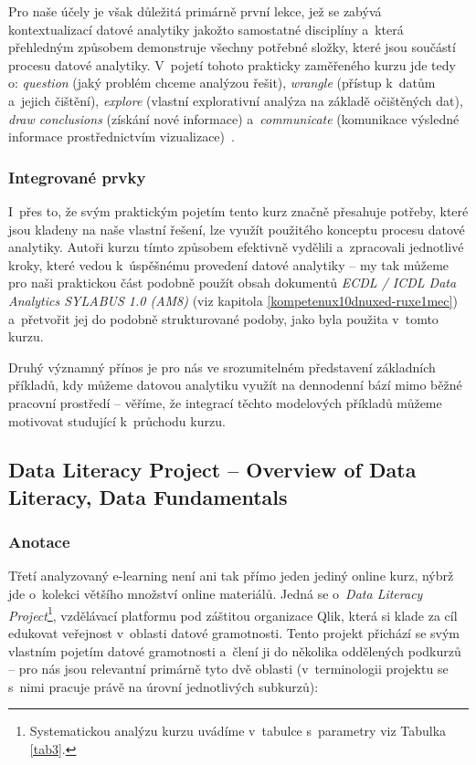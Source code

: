 Pro naše účely je však důležitá primárně první lekce, jež se zabývá kontextualizací datové analytiky jakožto samostatné disciplíny a~která přehledným způsobem demonstruje všechny potřebné složky, které jsou součástí procesu datové analytiky. V~pojetí tohoto prakticky zaměřeného kurzu jde tedy o: \emph{question} (jaký problém chceme analýzou řešit), \emph{wrangle} (přístup k~datům a~jejich čištění), \emph{explore} (vlastní explorativní analýza na základě očištěných dat), \emph{draw conclusions} (získání nové informace) a~\emph{communicate} (komunikace výsledné informace prostřednictvím vizualizace)~\parencite{course2}.

\hypertarget{integrovanuxe9-prvky-1}{%
\subsubsection{Integrované prvky}\label{integrovanuxe9-prvky-1}}

I~přes to, že svým praktickým pojetím tento kurz značně přesahuje potřeby, které jsou kladeny na naše vlastní řešení, lze využít použitého konceptu procesu datové analytiky. Autoři kurzu tímto způsobem efektivně vydělili a~zpracovali jednotlivé kroky, které vedou k~úspěšnému provedení datové analytiky -- my tak můžeme pro naši praktickou část podobně použít obsah dokumentů \emph{ECDL / ICDL Data Analytics SYLABUS 1.0 (AM8)} (viz kapitola \ref{kompetenux10dnuxed-ruxe1mec}) a~přetvořit jej do podobně strukturované podoby, jako byla použita v~tomto kurzu.

Druhý významný přínos je pro nás ve srozumitelném představení základních příkladů, kdy můžeme datovou analytiku využít na dennodenní bází mimo běžné pracovní prostředí -- věříme, že integrací těchto modelových příkladů můžeme motivovat studující k~průchodu kurzu.

\hypertarget{data-literacy-project-overview-of-data-literacy-data-fundamentals}{%
\subsection{Data Literacy Project -- Overview of Data Literacy, Data Fundamentals}\label{data-literacy-project-overview-of-data-literacy-data-fundamentals}}

\hypertarget{anotace-2}{%
\subsubsection{Anotace}\label{anotace-2}}

Třetí analyzovaný e-learning není ani tak přímo jeden jediný online kurz, nýbrž jde o~kolekci většího množství online materiálů. Jedná se o~\emph{Data Literacy Project}\footnote{Systematickou analýzu kurzu uvádíme v~tabulce s~parametry viz Tabulka \ref{tab3}.}, vzdělávací platformu pod záštitou organizace Qlik, která si klade za cíl edukovat veřejnost v~oblasti datové gramotnosti. Tento projekt přichází se svým vlastním pojetím datové gramotnosti a~člení ji do několika oddělených podkurzů -- pro nás jsou relevantní primárně tyto dvě oblasti (v~terminologii projektu se s~nimi pracuje právě na úrovní jednotlivých subkurzů):

